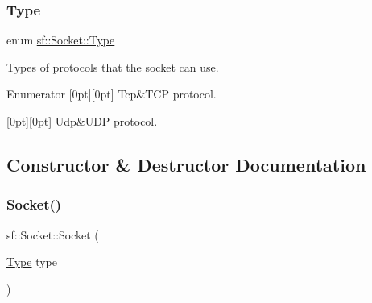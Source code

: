 \subsubsection{\texorpdfstring{Type}{Type}}
{\footnotesize\ttfamily enum \hyperlink{classsf_1_1_socket_a5d3ff44e56e68f02816bb0fabc34adf8}{sf\+::\+Socket\+::\+Type}\hspace{0.3cm}{\ttfamily [protected]}}



Types of protocols that the socket can use. 

\begin{DoxyEnumFields}{Enumerator}
[0pt][0pt]{}\mbox{\label{classsf_1_1_socket_a5d3ff44e56e68f02816bb0fabc34adf8acc02e97e90234b957eaad4dff7f22214}} 
Tcp&T\+CP protocol. \\
\hline

[0pt][0pt]{}\mbox{\label{classsf_1_1_socket_a5d3ff44e56e68f02816bb0fabc34adf8a6ebf3094830db4820191a327f3cc6ce2}} 
Udp&U\+DP protocol. \\
\hline

\end{DoxyEnumFields}


\subsection{Constructor \& Destructor Documentation}
\mbox{\label{classsf_1_1_socket_a80ffb47ec0bafc83af019055d3e6a303}} 
\subsubsection{\texorpdfstring{Socket()}{Socket()}}
{\footnotesize\ttfamily sf\+::\+Socket\+::\+Socket (\begin{DoxyParamCaption}\item[{\hyperlink{classsf_1_1_socket_a5d3ff44e56e68f02816bb0fabc34adf8}{Type}}]{type }\end{DoxyParamCaption})\hspace{0.3cm}{\ttfamily [protected]}}



